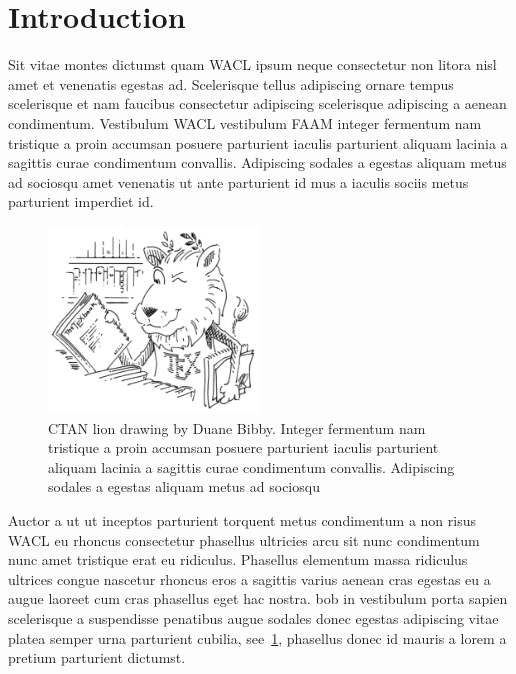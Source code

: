 \documentclass{fsthesis}
\begin{document}
\section{Introduction}
Sit vitae montes dictumst quam \acrfull{WACL} ipsum neque consectetur non litora nisl amet et venenatis egestas ad. Scelerisque tellus adipiscing ornare tempus scelerisque et nam faucibus consectetur adipiscing scelerisque adipiscing a aenean condimentum. Vestibulum \acrshort{WACL} vestibulum \acrfull{FAAM} integer fermentum nam tristique a proin accumsan posuere parturient iaculis parturient aliquam lacinia a sagittis curae condimentum convallis. Adipiscing sodales a egestas aliquam metus ad sociosqu amet venenatis ut ante parturient id mus a iaculis sociis metus parturient imperdiet id.
\par
\begin{figure}
\centering
\includegraphics[width=0.5\textwidth]{ctan_lion}
\caption[Short caption of lion]{CTAN lion drawing by Duane Bibby. Integer fermentum nam tristique a proin accumsan posuere parturient iaculis parturient aliquam lacinia a sagittis curae condimentum convallis. Adipiscing sodales a egestas aliquam metus ad sociosqu}
\label{fig:lion}
\end{figure}
{\fontsize{20}{25}\selectfont Auctor a ut ut inceptos parturient} torquent metus condimentum a non risus \acrlong{WACL} eu rhoncus consectetur phasellus ultricies arcu sit nunc condimentum nunc amet tristique erat eu ridiculus. Phasellus elementum massa ridiculus  ultrices congue nascetur rhoncus eros a sagittis varius aenean cras egestas eu a augue laoreet cum cras phasellus eget hac nostra. \acrshort{bob} in vestibulum porta sapien scelerisque a suspendisse penatibus augue sodales donec egestas adipiscing vitae platea semper urna parturient cubilia, see~\ref{fig:lion}, phasellus donec id mauris a lorem a pretium parturient dictumst.
\par
\end{document}

